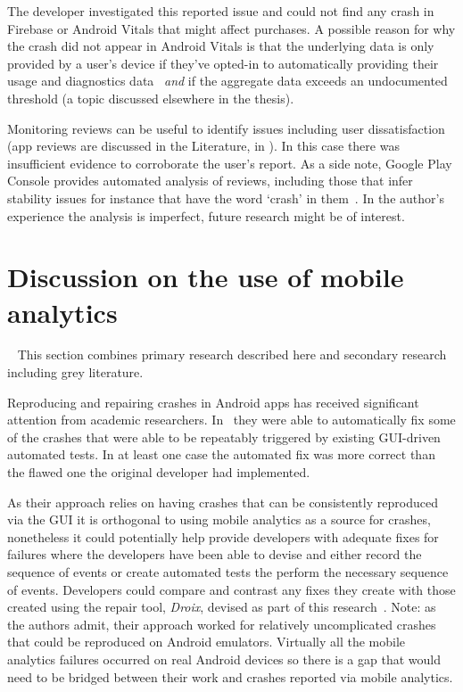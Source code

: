 The developer investigated this reported issue and could not find any crash in Firebase or Android Vitals that might affect purchases. A possible reason for why the crash did not appear in Android Vitals is that the underlying data is only provided by a user's device if they've opted-in to automatically providing their usage and diagnostics data~ \textit{and} if the aggregate data exceeds an undocumented threshold (a topic discussed elsewhere in the thesis). 

Monitoring reviews can be useful to identify issues including user dissatisfaction (app reviews are discussed in the Literature, in ). In this case there was insufficient evidence to corroborate the user's report. As a side note, Google Play Console provides automated analysis of reviews, including those that infer stability issues for instance that have the word `crash' in them~. In the author's experience the analysis is imperfect, future research might be of interest.






\section{Discussion on the use of mobile analytics}~\label{aiu-discussion-section}
This section combines primary research described here and secondary research including grey literature.


 Reproducing and repairing crashes in Android apps has received significant attention from academic researchers. In~ they were able to automatically fix some of the crashes that were able to be repeatably triggered by existing GUI-driven automated tests. In at least one case the automated fix was more correct than the flawed one the original developer had implemented. 

As their approach relies on having crashes that can be consistently reproduced via the GUI it is orthogonal to using mobile analytics as a source for crashes, nonetheless it could potentially help provide developers with adequate fixes for failures where the developers have been able to devise and either record the sequence of events or create automated tests the perform the necessary sequence of events. Developers could compare and contrast any fixes they create with those created using the repair tool, \textit{Droix}, devised as part of this research~. Note: as the authors admit, their approach worked for relatively uncomplicated crashes that could be reproduced on Android emulators. Virtually all the mobile analytics failures occurred on real Android devices so there is a gap that would need to be bridged between their work and crashes reported via mobile analytics.  

